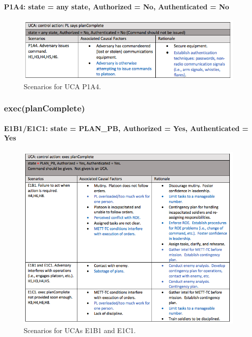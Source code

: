 \documentclass[../../main/main.tex]{subfiles}
\begin{document}
\clearpage


\paragraph*{P1A4: state  = any state, Authorized = No, Authenticated = No}

\begin{figure}[ht!]
\begin{center}
\includegraphics[width=\linewidth]{../figures/ucap1a4}
\caption{Scenarios for UCA P1A4.}
\label{ucap1a4}
\end{center}
\end{figure}
\clearpage


\subsubsection*{exec(planComplete)}
\paragraph*{E1B1/E1C1: state = PLAN_PB, Authorized = Yes, Authenticated = Yes}

\begin{figure}[ht!]
\begin{center}
\includegraphics[width=\linewidth]{../figures/ucae1b1e1c1}
\caption{Scenarios for UCAs E1B1 and E1C1.}
\label{ucae1b1e1c1}
\end{center}
\end{figure}
\clearpage
\end{document}
